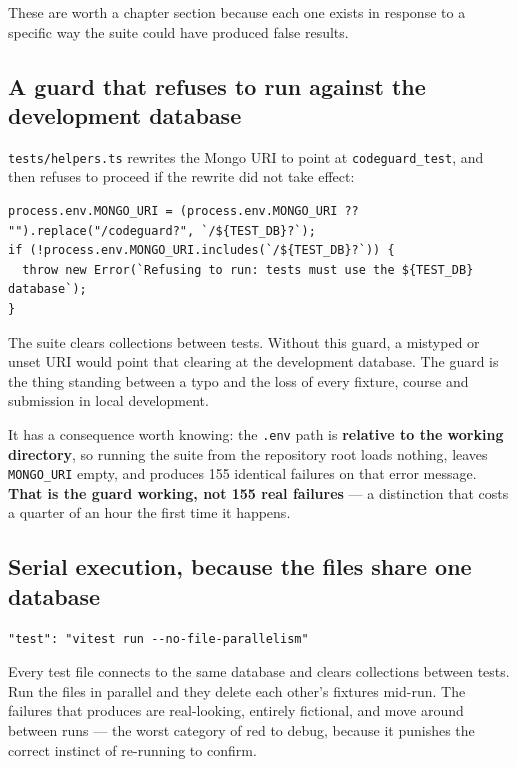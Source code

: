 These are worth a chapter section because each one exists in response to
a specific way the suite could have produced false results.

\hypertarget{a-guard-that-refuses-to-run-against-the-development-database}{%
\subsection{A guard that refuses to run against the development
database}\label{a-guard-that-refuses-to-run-against-the-development-database}}

\texttt{tests/helpers.ts} rewrites the Mongo URI to point at
\texttt{codeguard\_test}, and then refuses to proceed if the rewrite did
not take effect:

\begin{verbatim}
process.env.MONGO_URI = (process.env.MONGO_URI ?? "").replace("/codeguard?", `/${TEST_DB}?`);
if (!process.env.MONGO_URI.includes(`/${TEST_DB}?`)) {
  throw new Error(`Refusing to run: tests must use the ${TEST_DB} database`);
}
\end{verbatim}

The suite clears collections between tests. Without this guard, a
mistyped or unset URI would point that clearing at the development
database. The guard is the thing standing between a typo and the loss of
every fixture, course and submission in local development.

It has a consequence worth knowing: the \texttt{.env} path is
\textbf{relative to the working directory}, so running the suite from
the repository root loads nothing, leaves \texttt{MONGO\_URI} empty, and
produces 155 identical failures on that error message. \textbf{That is
the guard working, not 155 real failures} --- a distinction that costs a
quarter of an hour the first time it happens.

\hypertarget{serial-execution-because-the-files-share-one-database}{%
\subsection{Serial execution, because the files share one
database}\label{serial-execution-because-the-files-share-one-database}}

\begin{verbatim}
"test": "vitest run --no-file-parallelism"
\end{verbatim}

Every test file connects to the same database and clears collections
between tests. Run the files in parallel and they delete each other's
fixtures mid-run. The failures that produces are real-looking, entirely
fictional, and move around between runs --- the worst category of red to
debug, because it punishes the correct instinct of re-running to
confirm.

